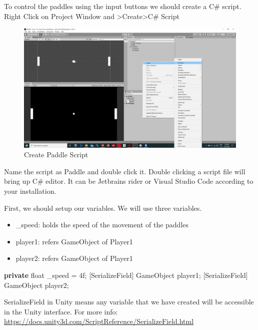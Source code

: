 \documentclass[
]{book}
\newenvironment{Shaded}{\begin{snugshade}}{\end{snugshade}}
\newcommand{\DataTypeTok}[1]{\textcolor[rgb]{0.13,0.29,0.53}{#1}}
\newcommand{\KeywordTok}[1]{\textcolor[rgb]{0.13,0.29,0.53}{\textbf{#1}}}
\newcommand{\NormalTok}[1]{#1}
\providecommand{\tightlist}{%
  \setlength{\itemsep}{0pt}\setlength{\parskip}{0pt}}
\begin{document}
To control the paddles using the input buttons we should create a C\# script. Right Click on Project Window and \textgreater Create\textgreater C\# Script

\begin{figure}
\centering
\includegraphics{Images/createScript.png}
\caption{Create Paddle Script}
\end{figure}

Name the script as Paddle and double click it. Double clicking a script file will bring up C\# editor. It can be Jetbrains rider or Visual Studio Code according to your installation.

First, we should setup our variables. We will use three variables.

\begin{itemize}
\tightlist
\item
  \_speed: holds the speed of the movement of the paddles
\item
  player1: refers GameObject of Player1
\item
  player2: refers GameObject of Player1
\end{itemize}

\begin{Shaded}
\begin{Highlighting}[]
\NormalTok{[SerializeField] }\KeywordTok{private} \DataTypeTok{float}\NormalTok{ _speed = 4f;}
\NormalTok{[SerializeField] GameObject player1;}
\NormalTok{[SerializeField] GameObject player2;}
\end{Highlighting}
\end{Shaded}

SerializeField in Unity means any variable that we have created will be accessible in the Unity interface. For more info: \url{https://docs.unity3d.com/ScriptReference/SerializeField.html}
\end{document}
